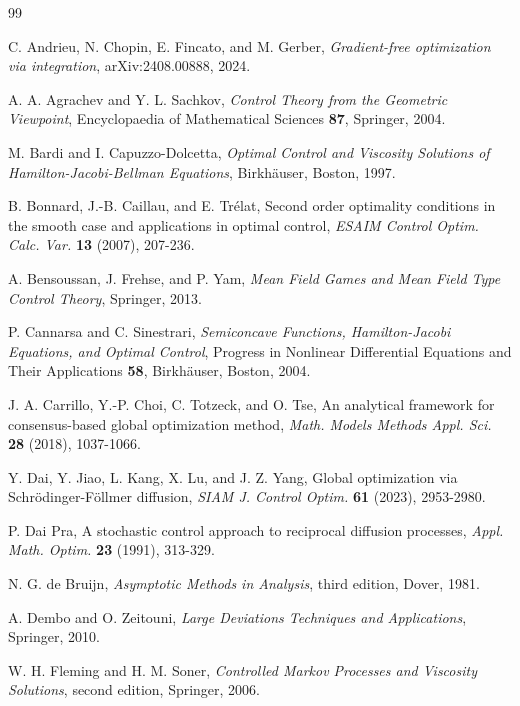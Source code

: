 \documentclass[11pt]{amsart}
\numberwithin{equation}{section}
\numberwithin{figure}{section}
\theoremstyle{definition}\newtheorem{remark}[theorem]{Remark}%
\begin{document}
\begin{thebibliography}{99}

C. Andrieu, N. Chopin, E. Fincato, and M. Gerber,
\emph{Gradient-free optimization via integration},
arXiv:2408.00888, 2024.


A. A. Agrachev and Y. L. Sachkov,
\emph{Control Theory from the Geometric Viewpoint},
Encyclopaedia of Mathematical Sciences \textbf{87}, Springer, 2004.

M. Bardi and I. Capuzzo-Dolcetta,
\emph{Optimal Control and Viscosity Solutions of Hamilton-Jacobi-Bellman Equations},
Birkh\"auser, Boston, 1997.

B. Bonnard, J.-B. Caillau, and E. Tr\'elat,
Second order optimality conditions in the smooth case and applications in optimal control,
\emph{ESAIM Control Optim. Calc. Var.} \textbf{13} (2007), 207-236.


A. Bensoussan, J. Frehse, and P. Yam,
\emph{Mean Field Games and Mean Field Type Control Theory},
Springer, 2013.


P. Cannarsa and C. Sinestrari,
\emph{Semiconcave Functions, Hamilton-Jacobi Equations, and Optimal Control},
Progress in Nonlinear Differential Equations and Their Applications \textbf{58}, Birkh\"auser, Boston, 2004.


J. A. Carrillo, Y.-P. Choi, C. Totzeck, and O. Tse,
An analytical framework for consensus-based global optimization method,
\emph{Math. Models Methods Appl. Sci.} \textbf{28} (2018), 1037-1066.

Y. Dai, Y. Jiao, L. Kang, X. Lu, and J. Z. Yang,
Global optimization via Schr\"odinger-F\"ollmer diffusion,
\emph{SIAM J. Control Optim.} \textbf{61} (2023), 2953-2980.

P. Dai Pra,
A stochastic control approach to reciprocal diffusion processes,
\emph{Appl. Math. Optim.} \textbf{23} (1991), 313-329.

N. G. de Bruijn,
\emph{Asymptotic Methods in Analysis},
third edition, Dover, 1981.

A. Dembo and O. Zeitouni,
\emph{Large Deviations Techniques and Applications},
Springer, 2010.

W. H. Fleming and H. M. Soner,
\emph{Controlled Markov Processes and Viscosity Solutions},
second edition, Springer, 2006.


\end{thebibliography}
\end{document}
